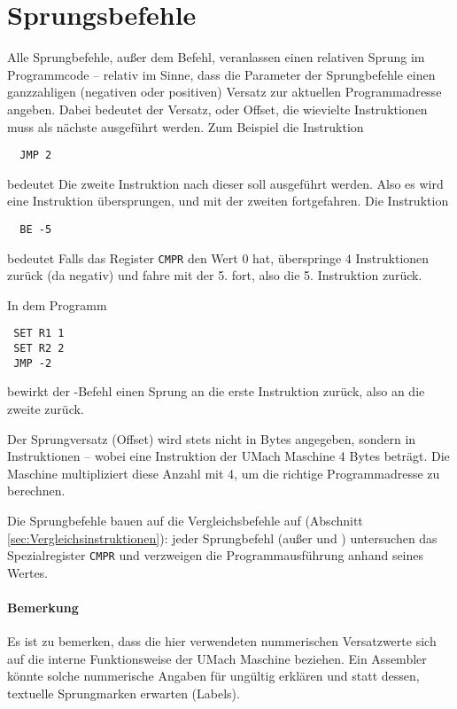 \section{Sprungsbefehle}
\label{sec:Sprungbefehle}

Alle Sprungbefehle, außer dem  Befehl, veranlassen einen relativen
Sprung im Programmcode -- relativ im Sinne, dass die Parameter der Sprungbefehle
einen ganzzahligen (negativen oder positiven) Versatz zur aktuellen
Programmadresse angeben. Dabei bedeutet der Versatz, oder
Offset, die wievielte Instruktionen muss als nächste ausgeführt
werden. Zum Beispiel die Instruktion
\begin{lstlisting}
  JMP 2
\end{lstlisting}
bedeutet
\glqq Die zweite Instruktion nach dieser soll ausgeführt werden\grqq. Also es
wird eine Instruktion übersprungen, und mit der zweiten fortgefahren.
Die Instruktion
\begin{lstlisting}
  BE -5
\end{lstlisting}
bedeutet \glqq Falls das Register \texttt{CMPR} den Wert $0$ hat, überspringe
$4$ Instruktionen zurück (da negativ) und fahre mit der 5. fort\grqq, also die
5. Instruktion zurück. 

In dem Programm
\begin{lstlisting}
 SET R1 1
 SET R2 2
 JMP -2
\end{lstlisting}
bewirkt der -Befehl einen Sprung an die erste Instruktion zurück,
also an die zweite zurück.

Der Sprungversatz (Offset) wird stets nicht in Bytes angegeben, sondern in
Instruktionen -- wobei eine Instruktion der UMach Maschine 4 Bytes beträgt. Die
Maschine multipliziert diese Anzahl mit 4, um die richtige Programmadresse zu
berechnen.

Die Sprungbefehle bauen auf die Vergleichsbefehle auf (Abschnitt
\ref{sec:Vergleichsinstruktionen}): jeder Sprungbefehl (außer 
und ) untersuchen das Spezialregister \texttt{CMPR} und verzweigen die
Programmausführung anhand seines Wertes.

\paragraph{Bemerkung}
Es ist zu bemerken, dass die hier verwendeten nummerischen Versatzwerte sich
auf die interne Funktionsweise der UMach Maschine beziehen. Ein Assembler
könnte solche nummerische Angaben für ungültig erklären und statt dessen,
textuelle Sprungmarken erwarten (Labels).


